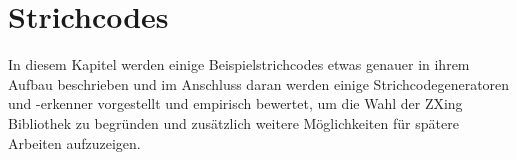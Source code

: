 \chapter{Strichcodes}
\writtenby{\dcauthornameriren}%
In diesem Kapitel werden einige Beispielstrichcodes etwas genauer in ihrem Aufbau beschrieben und im Anschluss daran werden einige Strichcodegeneratoren und -erkenner vorgestellt und empirisch bewertet, um die Wahl der ZXing Bibliothek zu begründen und zusätzlich weitere Möglichkeiten für spätere Arbeiten aufzuzeigen.




